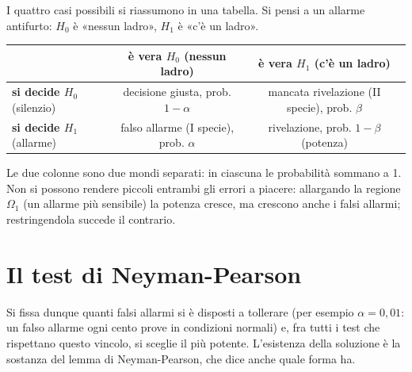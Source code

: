 I quattro casi possibili si riassumono in una tabella. Si pensi a un allarme antifurto: $H_0$ è «nessun ladro», $H_1$ è
«c'è un ladro».
\begin{center}
\renewcommand{\arraystretch}{1.5}
\begin{tabular}{@{}l|c|c@{}}
  & \textbf{è vera $H_0$} (nessun ladro) & \textbf{è vera $H_1$} (c'è un ladro) \\ \hline
  \textbf{si decide $H_0$} (silenzio) & \cellcolor{mspiC!15} decisione giusta, prob. $1 - \alpha$ &
  \cellcolor{mspiB!20} mancata rivelazione (II specie), prob. $\beta$ \\ \hline
  \textbf{si decide $H_1$} (allarme) & \cellcolor{mspiB!20} falso allarme (I specie), prob. $\alpha$ &
  \cellcolor{mspiC!15} rivelazione, prob. $1 - \beta$ (potenza)
\end{tabular}
\end{center}
Le due colonne sono due mondi separati: in ciascuna le probabilità sommano a 1. Non si possono rendere piccoli entrambi
gli errori a piacere: allargando la regione $\Omega_1$ (un allarme più sensibile) la potenza cresce, ma crescono anche
i falsi allarmi; restringendola succede il contrario.

\section{Il test di Neyman-Pearson}


Si fissa dunque quanti falsi allarmi si è disposti a tollerare (per esempio $\alpha = 0{,}01$: un falso allarme ogni
cento prove in condizioni normali) e, fra tutti i test che rispettano questo vincolo, si sceglie il più potente.
L'esistenza della soluzione è la sostanza del lemma di Neyman-Pearson, che dice anche quale forma ha.


